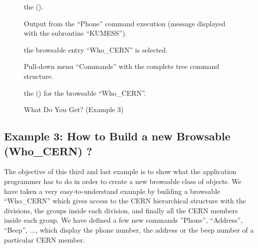 \condbreak{.5\textheight}

\begin{figure}[htb]
\vspace{-1\baselineskip}
\begin{EnumZB}
\item
the \EW{} (\INP{}).
\item
Output from the ``Phone'' command execution (message displayed with 
the \KUIP{} subroutine ``KUMESS'').
\item
the browsable entry ``Who\_CERN'' is selected.
\item
Pull-down menu ``Commands'' with the complete tree command structure.
\item
the \MB{} (\OW{}) for the browsable ``Who\_CERN''.
\vspace{-1\baselineskip}
\end{EnumZB}
\caption{What Do You Get? (Example 3)}
\label{ref:FIGPKEX5}
\end{figure}

\subsection{Example 3: How to Build a new Browsable (Who\_CERN) ?}
\label{ref:reexbr}

The objective of this third and last example is to show what the
application programmer has to do in order to create a new browsable 
class of objects. We have taken a very easy-to-understand example by building
a browsable ``Who\_CERN'' which gives access to the CERN hierarchical 
structure with the divisions, the groups inside each division, and finally 
all the CERN members inside each group. We have defined a few new commands
''Phone'', ``Address'', ``Beep'', ..., which display the phone number,
the address or the beep number of a particular CERN member.

